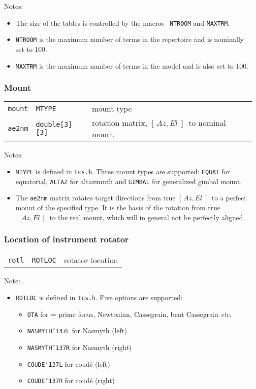 \documentclass[12pt,fleqn,twoside]{article}
\renewcommand{\_}{{\tt\char'137}}     %
\newcommand{\azel}      {$[\,Az,El~]$}
\newcommand{\notelist}  {\goodbreak \vspace{1ex} Notes:
                        \vspace{-3ex}}
\newcommand{\anotelist}  {\goodbreak \vspace{1ex} Note:
                        \vspace{-3ex}}
\begin{document}
\notelist
\begin{itemize}
\item The size of the tables is controlled by the macros {\tt
NTROOM} and {\tt MAXTRM}. \item {\tt NTROOM} is the maximum number
of terms in the repertoire
      and is nominally set to 100.
\item {\tt MAXTRM} is the maximum number of terms in the
      model and is also set to 100.
\end{itemize}

\subsubsection{Mount}
\begin{tabular}{lll}
{\tt mount} & {\tt MTYPE} & mount type \\
{\tt ae2nm} & {\tt double[3][3]} & rotation matrix, \azel\ to nominal mount \\
\end{tabular}

\notelist
\begin{itemize}
\item {\tt MTYPE} is defined in {\tt tcs.h}. Three mount types are
      supported: {\tt EQUAT} for equatorial, {\tt ALTAZ} for altazimuth
      and {\tt GIMBAL} for generalized gimbal mount.
\item The {\tt ae2nm} matrix rotates target directions from true
      \azel\ to a perfect mount of the specified type.  It is the basis
      of the rotation from true \azel\ to the real mount, which will
      in general not be perfectly aligned.
\end{itemize}

\subsubsection{Location of instrument rotator}
\begin{tabular}{lll}
{\tt rotl} & {\tt ROTLOC} & rotator location \\
\end{tabular}

\anotelist
\begin{itemize}
\item {\tt ROTLOC} is defined in {\tt tcs.h}. Five options are supported:
      \begin{itemize}
      \item {\tt OTA} for = prime focus, Newtonian, Cassegrain,
            bent Cassegrain {\it etc.}
      \item {\tt NASMYTH\_L} for Nasmyth (left)
      \item {\tt NASMYTH\_R} for Nasmyth (right)
      \item {\tt COUDE\_L} for coud\'{e} (left)
      \item {\tt COUDE\_R} for coud\'{e} (right)
      \end{itemize}
\end{itemize}
\end{document}
